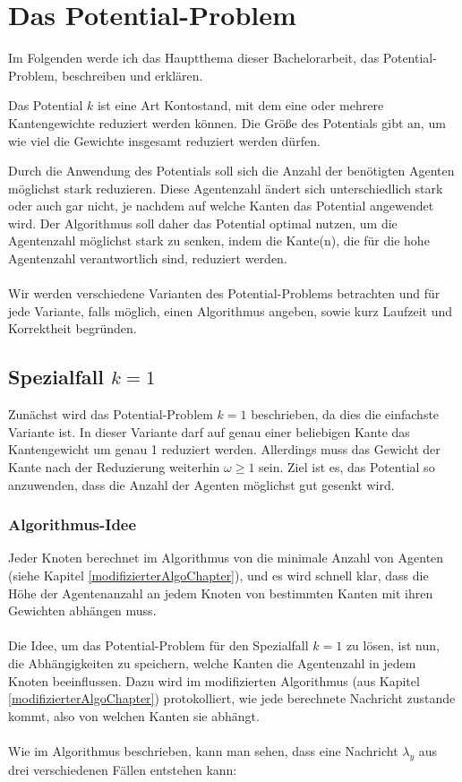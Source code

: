 \section{Das Potential-Problem}\label{kap_pot}

Im Folgenden werde ich das Hauptthema dieser Bachelorarbeit, das Potential-Problem, beschreiben und erklären.

\begin{mydef}\label{def_potential}
	Das Potential $k$ ist eine Art Kontostand, mit dem eine oder mehrere Kantengewichte reduziert werden können. Die Größe des Potentials gibt an, um wie viel die Gewichte insgesamt reduziert werden dürfen. 
\end{mydef}
Durch die Anwendung des Potentials soll sich die Anzahl der benötigten Agenten möglichst stark reduzieren. Diese Agentenzahl ändert sich unterschiedlich stark oder auch gar nicht, je nachdem auf welche Kanten das Potential angewendet wird. Der Algorithmus soll daher das Potential optimal nutzen, um die Agentenzahl möglichst stark zu senken, indem die Kante(n), die für die hohe Agentenzahl verantwortlich sind, reduziert werden.
\\
\\
Wir werden verschiedene Varianten des Potential-Problems betrachten und für jede Variante, falls möglich, einen Algorithmus angeben, sowie kurz Laufzeit und Korrektheit begründen.

\subsection{Spezialfall $k = 1$}\label{kap_pot=1}

Zunächst wird das Potential-Problem $k = 1$ beschrieben, da dies die einfachste Variante ist. In dieser Variante darf auf genau einer beliebigen Kante das Kantengewicht um genau 1 reduziert werden. Allerdings muss das Gewicht der Kante nach der Reduzierung weiterhin $\omega \geq 1$ sein. Ziel ist es, das Potential so anzuwenden, dass die Anzahl der Agenten möglichst gut gesenkt wird.


\subsubsection{Algorithmus-Idee}

Jeder Knoten berechnet im Algorithmus von \cite{cima_paper} die minimale Anzahl von Agenten (siehe Kapitel \ref{modifizierterAlgoChapter}), und es wird schnell klar, dass die Höhe der Agentenanzahl an jedem Knoten von bestimmten Kanten mit ihren Gewichten abhängen muss.
\\
\\
Die Idee, um das Potential-Problem für den Spezialfall $k = 1$ zu lösen, ist nun, die Abhängigkeiten zu speichern, welche Kanten die Agentenzahl in jedem Knoten beeinflussen. Dazu wird im modifizierten Algorithmus (aus Kapitel \ref{modifizierterAlgoChapter}) protokolliert, wie jede berechnete Nachricht zustande kommt, also von welchen Kanten sie abhängt.
\\
\\ 
Wie im Algorithmus beschrieben, kann man sehen, dass eine Nachricht $\lambda_{y}$ aus drei verschiedenen Fällen entstehen kann:

